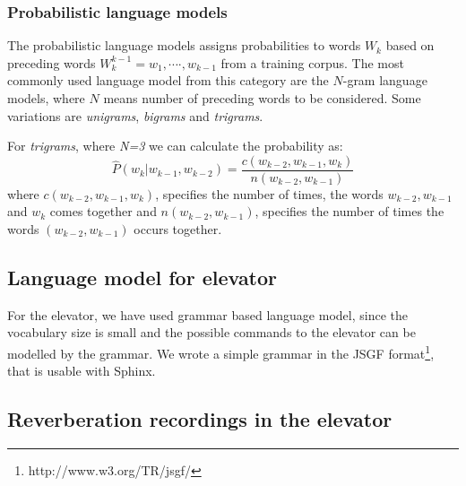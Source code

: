 \documentclass[a4paper, 12pt]{article}
\begin{document}
\subsubsection*{Probabilistic language models}
\label{sec:prob_lang_model}
The probabilistic language models assigns probabilities to words $\textit{W}_k$ based on preceding words $\textit{W}_k^{k-1} = \textit{w}_1 , \cdots \cdot,\textit{w}_{k-1}$  from a training corpus. The most commonly used language model from this category are the $N$-gram language models, where $N$ means number of preceding words to be considered. Some variations are \textit{unigrams}, \textit{bigrams} and \textit{trigrams}. 

For \textit{trigrams}, where \textit{N=3} we can calculate the probability as:
\begin{equation}
  \hat{P}(w_k | w_{k-1},w_{k-2}) = \frac{c(w_{k-2},w_{k-1},w_k)}{n(w_{k-2},w_{k-1})} 
\end{equation}
where $c(w_{k-2},w_{k-1},w_k)$, specifies the number of times, the words $w_{k-2},w_{k-1}$ and $w_k$ comes together and $n(w_{k-2},w_{k-1})$, specifies the number of times the words $(w_{k-2},w_{k-1})$ occurs together. 

\subsection{Language model for elevator}
For the elevator, we have used grammar based language model, since the vocabulary size is small and the possible commands to the elevator can be modelled by the grammar. 
We wrote a simple grammar in the JSGF format\footnote{http://www.w3.org/TR/jsgf/}, that is usable with Sphinx.

\subsection{Reverberation recordings in the elevator}
\end{document}
